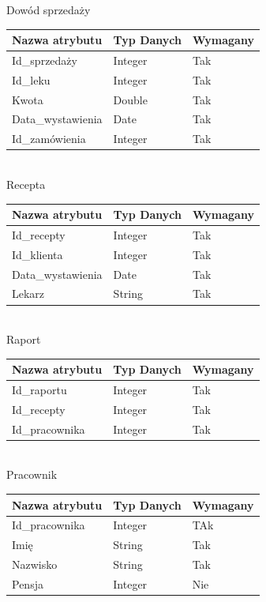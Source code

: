\documentclass[a4paper, 11pt]{article}
\begin{document}
Dowód sprzedaży\\
\begin{tabular}{|l|l|l|} \hline
Nazwa   atrybutu	& Typ Danych	& Wymagany \\ \hline
Id\_sprzedaży	& Integer &	Tak\\ \hline
Id\_leku &	Integer	& Tak\\ \hline
Kwota	& Double &	Tak\\ \hline
Data\_wystawienia	& Date	& Tak\\ \hline
Id\_zamówienia	& Integer	& Tak\\ \hline
\end{tabular}\\[1cm]

Recepta\\
\begin{tabular}{|l|l|l|} \hline
Nazwa   atrybutu	& Typ Danych	& Wymagany \\ \hline
Id\_recepty &	Integer	& Tak\\ \hline
Id\_klienta	& Integer	 &Tak\\ \hline
Data\_wystawienia& 	Date	 &Tak\\ \hline
Lekarz &	String &	Tak\\ \hline
\end{tabular}\\[1cm]	
\newpage
Raport\\
\begin{tabular}{|l|l|l|} \hline
Nazwa   atrybutu	& Typ Danych	& Wymagany \\ \hline
Id\_raportu	& Integer	& Tak\\ \hline
Id\_recepty	& Integer	& Tak\\ \hline
Id\_pracownika	& Integer	& Tak\\ \hline
\end{tabular}\\[1cm]	

Pracownik \\
\begin{tabular}{|l|l|l|} \hline
Nazwa   atrybutu	& Typ Danych	& Wymagany \\ \hline
Id\_pracownika	& Integer	& TAk\\ \hline
Imię	& String	& Tak\\ \hline
Nazwisko	& String	& Tak\\ \hline
Pensja	& Integer	& Nie\\ \hline
\end{tabular}\\[1cm]	
\end{document}
